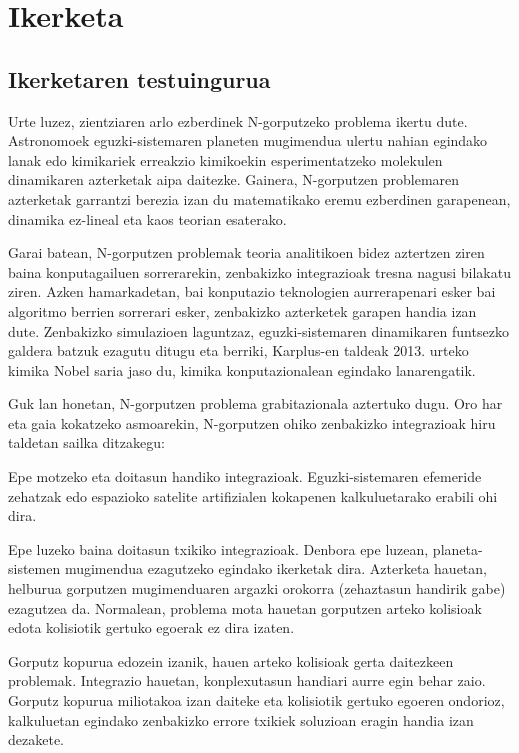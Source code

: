 \chapter{Ikerketa}


\section{Ikerketaren testuingurua}

Urte luzez, zientziaren arlo ezberdinek N-gorputzeko problema ikertu dute. Astronomoek eguzki-sistemaren planeten mugimendua ulertu nahian egindako lanak edo kimikariek erreakzio kimikoekin esperimentatzeko molekulen dinamikaren azterketak aipa daitezke. Gainera,  N-gorputzen problemaren azterketak garrantzi berezia izan du matematikako eremu ezberdinen garapenean,  dinamika ez-lineal eta kaos teorian esaterako. 

Garai batean, N-gorputzen problemak teoria analitikoen bidez aztertzen ziren baina konputagailuen sorrerarekin, zenbakizko integrazioak tresna nagusi bilakatu ziren. Azken hamarkadetan, bai konputazio teknologien aurrerapenari esker bai algoritmo berrien sorrerari esker, zenbakizko azterketek garapen handia izan dute. Zenbakizko simulazioen laguntzaz, eguzki-sistemaren dinamikaren funtsezko galdera batzuk ezagutu ditugu eta berriki, Karplus-en taldeak 2013. urteko kimika Nobel saria \cite{Karplus2014} jaso du, kimika konputazionalean egindako lanarengatik.       

Guk lan honetan, N-gorputzen problema grabitazionala aztertuko dugu. Oro har eta gaia kokatzeko asmoarekin, N-gorputzen ohiko zenbakizko  integrazioak hiru taldetan sailka ditzakegu:
\begin{enumerate}
{
\item Epe motzeko eta doitasun handiko integrazioak. 
 Eguzki-sistemaren efemeride zehatzak \cite{Folkner2014} edo espazioko satelite artifizialen kokapenen \cite{Beylkin2014} kalkuluetarako erabili ohi dira.
\item Epe luzeko baina doitasun txikiko integrazioak.
 Denbora epe luzean, planeta-sistemen mugimendua ezagutzeko egindako ikerketak dira. Azterketa hauetan, helburua gorputzen mugimenduaren argazki orokorra (zehaztasun handirik gabe) ezagutzea da. Normalean, problema mota hauetan gorputzen arteko kolisioak edota kolisiotik gertuko egoerak ez dira izaten.     
\item Gorputz kopurua edozein izanik, hauen arteko kolisioak gerta daitezkeen problemak.
 Integrazio hauetan, konplexutasun handiari aurre egin behar zaio. Gorputz kopurua miliotakoa \cite{Ishiyama2012} izan daiteke eta kolisiotik gertuko egoeren ondorioz, kalkuluetan egindako zenbakizko errore txikiek soluzioan eragin handia izan dezakete.    
}
\end{enumerate}

